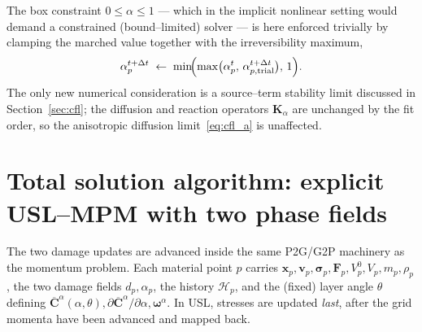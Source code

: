 \documentclass[12pt,a4paper]{article}
\newcommand{\bF}{\mathbf{F}}
\newcommand{\bsig}{\boldsymbol{\sigma}}
\newcommand{\bv}{\mathbf{v}}
\newcommand{\bK}{\mathbf{K}}
\newcommand{\bx}{\mathbf{x}}
\newcommand{\bomega}{\boldsymbol{\omega}}
\newcommand{\Ca}{\overline{\mathbf{C}}^{\alpha}}     %
\newcommand{\Dt}{\Delta t}
\begin{document}
	The box constraint $0\le\alpha\le1$ --- which in the implicit nonlinear setting
	would demand a constrained (bound--limited) solver --- is here enforced trivially
	by clamping the marched value together with the irreversibility maximum,
	\begin{equation}\label{eq:clamp}
		\alpha_p^{t+\Dt}\;\leftarrow\;\min\!\Bigl(\max\bigl(\alpha_p^{t},\,\alpha_{p,\mathrm{trial}}^{t+\Dt}\bigr),\,1\Bigr).
	\end{equation}
	The only new numerical consideration is a source--term stability limit discussed
	in Section~\ref{sec:cfl}; the diffusion and reaction operators
	$\bK_\alpha$ are unchanged by the fit order, so the anisotropic diffusion
	limit~\eqref{eq:cfl_a} is unaffected.

	\section{Total solution algorithm: explicit USL--MPM with two phase fields}\label{sec:algo}

	The two damage updates are advanced inside the same P2G/G2P machinery as the
	momentum problem. Each material point $p$ carries
	$\bx_p,\bv_p,\bsig_p,\bF_p,V_p^0,V_p,m_p,\rho_p$, the two damage fields
	$d_p,\alpha_p$, the history $\mathcal{H}_p$, and the (fixed) layer angle
	$\theta$ defining $\Ca(\alpha,\theta),\partial\Ca/\partial\alpha,\bomega^{\alpha}$.
	In USL, stresses are updated \emph{last}, after the grid momenta have been
	advanced and mapped back.
\end{document}
